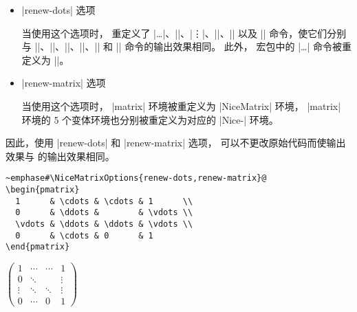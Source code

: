 \documentclass[dvipsnames]{article}%
\begin{document}
\smallskip

\begin{itemize}
\item |renew-dots| 选项\par\nobreak

当使用这个选项时， 重定义了 |\ldots|、|\cdots|、|\vdots|、|\ddots|、|\iddots| 以及 |\hdotsfor| 命令，使它们分别与 |\Ldots|、|\Cdots|、|\Vdots|、|\Ddots|、|\Iddots| 和 |\Hdotsfor| 命令的输出效果相同。
此外，  宏包中的 |\dots| 命令被重定义为 |\Ldots|。

\item |renew-matrix| 选项\par\nobreak 

当使用这个选项时， |{matrix}| 环境被重定义为 |{NiceMatrix}| 环境，
 |{matrix}| 环境的 5 个变体环境也分别被重定义为对应的 |Nice-| 环境。
\end{itemize}

\bigskip 
因此，使用 |renew-dots| 和 |renew-matrix| 选项，
可以不更改原始代码而使输出效果与  的输出效果相同。\par\nobreak

\bigskip
\begin{scope}
\begin{BVerbatim}[baseline=c,boxwidth=10cm]
~emphase#\NiceMatrixOptions{renew-dots,renew-matrix}@
\begin{pmatrix}
  1      & \cdots & \cdots & 1      \\
  0      & \ddots &        & \vdots \\
  \vdots & \ddots & \ddots & \vdots \\
  0      & \cdots & 0      & 1
\end{pmatrix}
\end{BVerbatim}
$\begin{pmatrix}
1      & \cdots & \cdots & 1      \\
0      & \ddots &        & \vdots \\
\vdots & \ddots & \ddots & \vdots \\
0      & \cdots & 0      & 1
\end{pmatrix}$
\end{scope}
\end{document}
